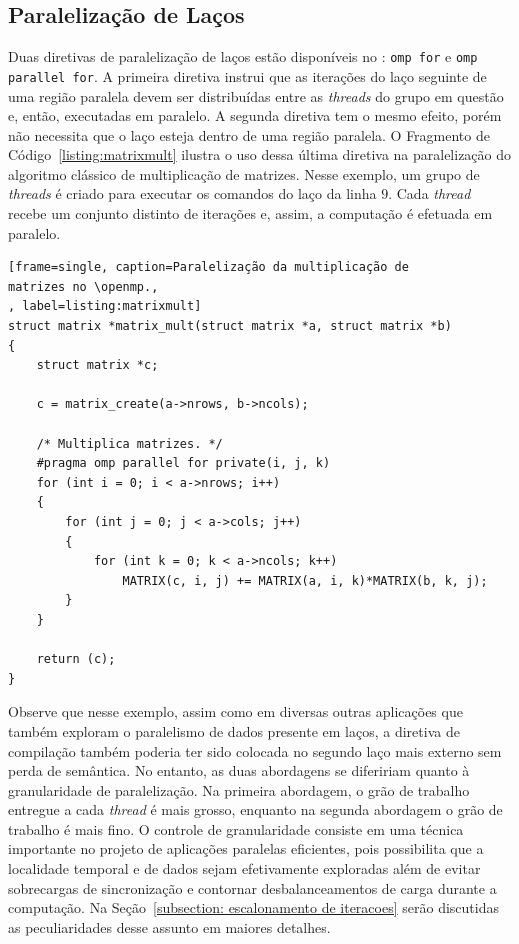 \documentclass{SBCbookchapter}
\begin{document}
	\subsection{Paralelização de Laços}
	\label{subsection: paralelização de lacos}

		Duas diretivas de paralelização de laços estão disponíveis no
		\openmp: \texttt{omp for} e \texttt{omp parallel for}. A primeira
		diretiva instrui que as iterações do laço seguinte de uma região
		paralela devem ser distribuídas entre as \textit{threads} do grupo em questão
		e, então, executadas em paralelo. A segunda diretiva tem o mesmo
		efeito, porém não necessita que o laço esteja dentro de uma região
		paralela. O Fragmento de Código~\ref{listing:matrixmult} ilustra o uso dessa última
		diretiva na paralelização do algoritmo clássico de multiplicação de
		matrizes. Nesse exemplo, um grupo de \textit{threads} é criado para
		executar os comandos do laço da linha $9$. Cada \textit{thread}
		recebe um conjunto distinto de iterações e, assim, a
		computação é efetuada em paralelo. 

\begin{lstlisting}[frame=single, caption=Paralelização da multiplicação de
matrizes no \openmp.,
, label=listing:matrixmult]
struct matrix *matrix_mult(struct matrix *a, struct matrix *b)
{
	struct matrix *c;

	c = matrix_create(a->nrows, b->ncols);

	/* Multiplica matrizes. */
	#pragma omp parallel for private(i, j, k)
	for (int i = 0; i < a->nrows; i++)
	{
		for (int j = 0; j < a->cols; j++)
		{
			for (int k = 0; k < a->ncols; k++)
				MATRIX(c, i, j) += MATRIX(a, i, k)*MATRIX(b, k, j);
		}
	}

	return (c);
}
\end{lstlisting}

		Observe que nesse exemplo, assim como em diversas outras aplicações que
		também exploram o paralelismo de dados presente em laços, a diretiva de
		compilação também poderia ter sido colocada no segundo laço mais externo
		sem perda de semântica. No entanto, as duas abordagens se difeririam
		quanto à granularidade de paralelização. Na primeira abordagem, o grão
		de trabalho entregue a cada \textit{thread} é mais grosso, enquanto na segunda
		abordagem o grão de trabalho é mais fino. O controle de granularidade
		consiste em uma técnica importante no projeto de aplicações paralelas
		eficientes, pois possibilita que a localidade temporal e de dados sejam efetivamente
		exploradas além de evitar sobrecargas de sincronização e contornar desbalanceamentos
		de carga durante a computação. Na Seção~\ref{subsection: escalonamento de iteracoes}
		serão discutidas as peculiaridades desse assunto em maiores detalhes.
\end{document}
